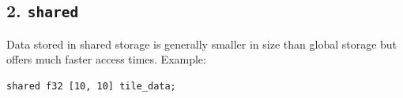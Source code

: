 \subsection*{2. \texttt{shared}}

Data stored in shared storage is generally smaller in size than global storage but offers much faster access times. Example:

\begin{lstlisting}[language=croqtile,caption={2. shared}]
shared f32 [10, 10] tile_data;
\end{lstlisting}
